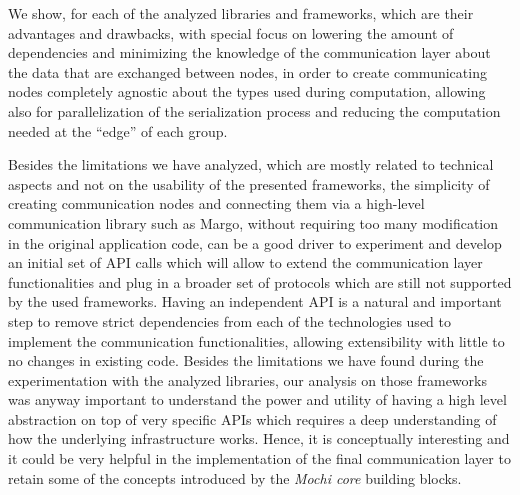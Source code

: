 We show, for each of the analyzed libraries and frameworks, which are their advantages and drawbacks, with special focus on lowering the amount of dependencies and minimizing the knowledge of the communication layer about the data that are exchanged between nodes, in order to create communicating nodes completely agnostic about the types used during computation, allowing also for parallelization of the serialization process and reducing the computation needed at the ``edge'' of each group.\newline

Besides the limitations we have analyzed, which are mostly related to technical aspects and not on the usability of the presented frameworks, the simplicity of creating communication nodes and connecting them via a high-level communication library such as Margo, without requiring too many modification in the original application code, can be a good driver to experiment and develop an initial set of API calls which will allow to extend the communication layer functionalities and plug in a broader set of protocols which are still not supported by the used frameworks. Having an independent API is a natural and important step to remove strict dependencies from each of the technologies used to implement the communication functionalities, allowing extensibility with little to no changes in existing code.
Besides the limitations we have found during the experimentation with the analyzed libraries, our analysis on those frameworks was anyway important to understand the power and utility of having a high level abstraction on top of very specific APIs which requires a deep understanding of how the underlying infrastructure works. Hence, it is conceptually interesting and it could be very helpful in the implementation of the final communication layer to retain some of the concepts introduced by the \textit{Mochi core} building blocks.
